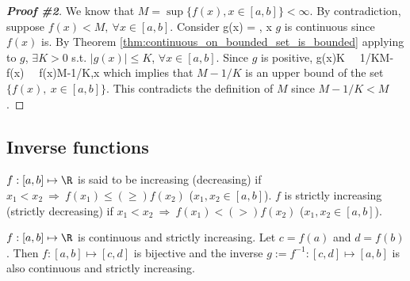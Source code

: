 \begin{proof}[{\bf Proof \#2}]
We know that $M=\sup\{f(x), x\in[a,b]\} <\infty$. By contradiction, suppose $f(x)<M,\ \forall x\in [a,b]$. Consider
\be
g(x) = , \quad\forall x \in [a,b]
\ee
$g$ is continuous since $f(x)$ is. By Theorem \ref{thm:continuous_on_bounded_set_is_bounded} applying to $g$, $\exists K>0$ s.t. $|g(x)|\leq K$, $\forall x\in[a,b]$. Since $g$ is positive, 
\be
g(x)\leq K \ \Rightarrow \ 1/K\leq M-f(x) \ \Rightarrow \ f(x)\leq M-1/K,\quad \forall x \in [a,b] 
\ee
which implies that $M-1/K$ is an upper bound of the set $\{f(x),\ x\in [a,b]\}$. This contradicts the definition of $M$ since $M-1/K<M$.
\end{proof}

\subsection{Inverse functions}

\begin{definition}\label{def:increasing_decreasing_funtion}
$f: [a,b]\mapsto \R$ is said to be increasing (decreasing) if $x_1<x_2 \ \Rightarrow \ f(x_1)\leq (\geq)f(x_2)$ ($x_1,x_2\in[a,b]$). $f$ is strictly increasing (strictly decreasing) if $x_1<x_2 \ \Rightarrow \ f(x_1) <(>) f(x_2)$ ($x_1,x_2\in[a,b]$).
\end{definition}

\begin{theorem}\label{thm:continuous_bijective_inverse_continuous}
$f: [a,b]\mapsto \R$ is continuous and strictly increasing. Let $c=f(a)$ and $d=f(b)$. Then $f: [a,b]\mapsto [c,d]$ is bijective and the inverse $g:=f^{-1}: [c,d]\mapsto [a,b]$ is also continuous and strictly increasing.
\end{theorem}


